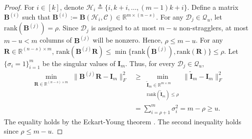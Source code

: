 \documentclass[journal,draftcls,onecolumn]{IEEEtran}
\theoremstyle{mystyle}
\newcommand{\floor}[1]{\left\lfloor #1\right\rfloor}
\newcommand{\aditya}[1]{\marginpar{+}{\bf Aditya's remark}: {\em #1}}
\newcommand{\sifat}[1]{\marginpar{+}{\bf Sifat's remark}: {\em #1}}
\begin{document}
\begin{proof}

For $i \in [k]$, denote $\mathcal{H}_i \triangleq \{ i, k+i, \dots,  (m-1)k + i \}$.
Define a matrix $\mathbf{B}^{(i)}$ such that $\mathbf{B}^{(i)} := \mathbf{B}(\mathcal{H}_i, \mathcal{C}) \in \mathbb{R}^{m \times (n-s)}$. 
 For any $\mathcal{D}_j\in\mathcal{Q}_u$, let $\text{rank}(\mathbf{B}^{(j)}) = \rho$. Since $\mathcal{D}_j$ is assigned to at most $m-u$ non-stragglers, at most $m-u < m$ columns of $\mathbf{B}^{(j)}$ will be nonzero. Hence, $\rho \le m-u$. For any $\mathbf{R} \in \mathbb{R}^{(n-s) \times m}$, $\text{rank}(\mathbf{B}^{(j)}\mathbf{R}) \le \min\{\text{rank}(\mathbf{B}^{(j)}), \text{rank}(\mathbf{R}) \} \le \rho$.
Let $\{\sigma_i = 1\}_{i = 1}^m$ be the singular values of $\mathbf{I}_m$. Thus, for every $\mathcal{D}_j\in\mathcal{Q}_u$,
\begin{align*} \min\limits_{\substack{\mathbf{R}\in \mathbb{R}^{(n-s) \times m} }}  {\|\mathbf{B}^{(j)} \mathbf{R}- \mathbf{I}_m\|_F^2} & \ge \min\limits_{\substack{\tilde{\mathbf{I}}_m\in \mathbb{R}^{m \times m} \\ \text{rank}(\tilde{\mathbf{I}}_m) \le \rho }}  {\|\tilde{\mathbf{I}}_m- \mathbf{I}_m\|_F^2} \\
& = \sum_{ i = \rho+1}^m \sigma_i^2 = m-\rho \ge u.
\end{align*}
The equality holds by the Eckart-Young theorem \cite{Eckart_Young_1936}. The second inequality holds since $\rho \le m-u$. 


\end{proof}
\end{document}
